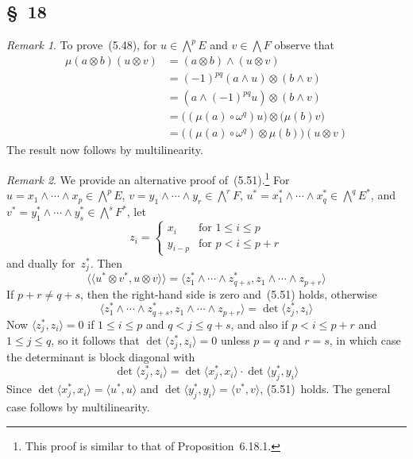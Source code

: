 \documentclass[letterpaper,12pt]{article}
\newcommand{\after}{\circ}
\newcommand{\mult}{\cdot}
\newcommand{\tprod}{\otimes}
\newcommand{\eprod}{\wedge}
\newcommand{\bigeprod}{\bigwedge}
\newcommand{\medeprod}{{\textstyle\bigeprod}}
\newcommand{\sprod}[2]{\langle#1,#2\rangle}
\newcommand{\ssprod}[2]{\langle\!\langle#1,#2\rangle\!\rangle}
\newcommand{\multi}[4]{#2_{#3}#1\cdots#1#2_{#4}}
\newcommand{\eprods}[3]{\multi{\eprod}{#1}{#2}{#3}}
\theoremstyle{definition}
\theoremstyle{remark}
\newtheorem*{rmk}{Remark}
\begin{document}
\subsection*{\S~18}
\begin{rmk}
To prove~(5.48), for \(u\in\medeprod^p E\) and \(v\in\medeprod F\) observe that
\begin{align*}
\mu(a\tprod b)(u\tprod v)&=(a\tprod b)\eprod(u\tprod v)\\
	&=(-1)^{pq}(a\eprod u)\tprod(b\eprod v)\\
	&=(a\eprod(-1)^{pq}u)\tprod(b\eprod v)\\
	&=\bigl((\mu(a)\after\omega^q)u\bigr)\tprod\bigl(\mu(b)v\bigr)\\
	&=\bigl((\mu(a)\after\omega^q)\tprod\mu(b)\bigr)(u\tprod v)
\end{align*}
The result now follows by multilinearity.
\end{rmk}

\begin{rmk}
We provide an alternative proof of~(5.51).\footnote{This proof is similar to that of Proposition~6.18.1.} For \(u=\eprods{x}{1}{p}\in\medeprod^p E\), \(v=\eprods{y}{1}{r}\in\medeprod^r F\), \(u^*=\eprods{x^*}{1}{q}\in\medeprod^q E^*\), and \(v^*=\eprods{y^*}{1}{s}\in\medeprod^s F^*\), let
\[z_i=\begin{cases}
x_i&\text{for }1\le i\le p\\
y_{i-p}&\text{for }p<i\le p+r
\end{cases}\]
and dually for~\(z^*_j\). Then
\[\ssprod{u^*\tprod v^*}{u\tprod v}=\sprod{\eprods{z^*}{1}{q+s}}{\eprods{z}{1}{p+r}}\]
If \(p+r\ne q+s\), then the right-hand side is zero and~(5.51) holds, otherwise
\[\sprod{\eprods{z^*}{1}{q+s}}{\eprods{z}{1}{p+r}}=\det\sprod{z^*_j}{z_i}\]
Now \(\sprod{z^*_j}{z_i}=0\) if \(1\le i\le p\) and \(q<j\le q+s\), and also if \(p<i\le p+r\) and \(1\le j\le q\), so it follows that \(\det\sprod{z^*_j}{z_i}=0\) unless \(p=q\) and \(r=s\), in which case the determinant is block diagonal with
\[\det\sprod{z^*_j}{z_i}=\det\sprod{x^*_j}{x_i}\mult\det\sprod{y^*_j}{y_i}\]
Since \(\det\sprod{x^*_j}{x_i}=\sprod{u^*}{u}\) and \(\det\sprod{y^*_j}{y_i}=\sprod{v^*}{v}\), (5.51)~holds. The general case follows by multilinearity.
\end{rmk}
\end{document}
